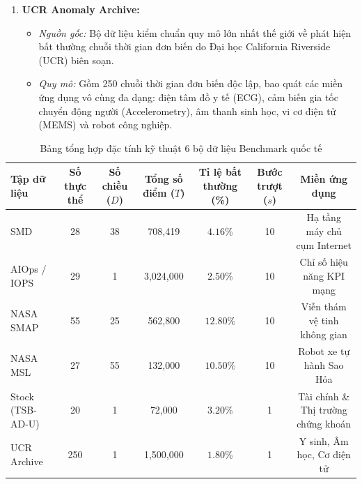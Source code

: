 \documentclass[11pt,journal,onecolumn]{IEEEtran}
\begin{document}
\begin{enumerate}
    \item \textbf{UCR Anomaly Archive:}
    \begin{itemize}
        \item \textit{Nguồn gốc:} Bộ dữ liệu kiểm chuẩn quy mô lớn nhất thế giới về phát hiện bất thường chuỗi thời gian đơn biến do Đại học California Riverside (UCR) biên soạn.
        \item \textit{Quy mô:} Gồm 250 chuỗi thời gian đơn biến độc lập, bao quát các miền ứng dụng vô cùng đa dạng: điện tâm đồ y tế (ECG), cảm biến gia tốc chuyển động người (Accelerometry), âm thanh sinh học, vi cơ điện tử (MEMS) và robot công nghiệp.
    \end{itemize}
\end{enumerate}

\begin{table}[htbp]
\centering
\caption{Bảng tổng hợp đặc tính kỹ thuật 6 bộ dữ liệu Benchmark quốc tế}
\label{tab:dataset_characteristics}
\begin{tabular}{lcccccc}
\toprule
\textbf{Tập dữ liệu} & \textbf{Số thực thể} & \textbf{Số chiều ($D$)} & \textbf{Tổng số điểm ($T$)} & \textbf{Tỉ lệ bất thường (\%)} & \textbf{Bước trượt ($s$)} & \textbf{Miền ứng dụng} \\
\midrule
SMD & 28 & 38 & 708,419 & $4.16\%$ & 10 & Hạ tầng máy chủ cụm Internet \\
AIOps / IOPS & 29 & 1 & 3,024,000 & $2.50\%$ & 10 & Chỉ số hiệu năng KPI mạng \\
NASA SMAP & 55 & 25 & 562,800 & $12.80\%$ & 10 & Viễn thám vệ tinh không gian \\
NASA MSL & 27 & 55 & 132,000 & $10.50\%$ & 10 & Robot xe tự hành Sao Hỏa \\
Stock (TSB-AD-U) & 20 & 1 & 72,000 & $3.20\%$ & 1 & Tài chính \& Thị trường chứng khoán \\
UCR Archive & 250 & 1 & 1,500,000 & $1.80\%$ & 1 & Y sinh, Âm học, Cơ điện tử \\
\bottomrule
\end{tabular}
\end{table}
\end{document}
